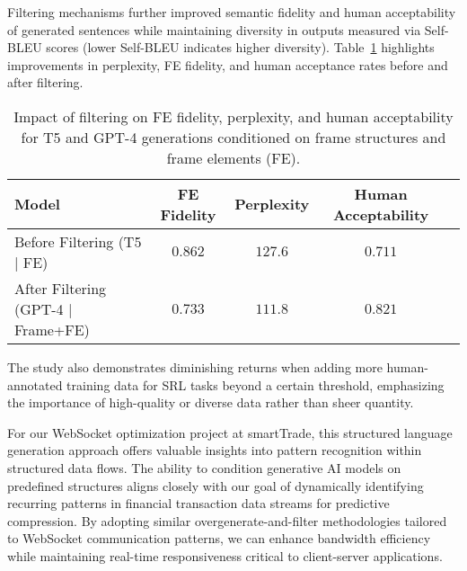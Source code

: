\documentclass[a4paper, 11pt, twoside, openright]{report}
\begin{document}
Filtering mechanisms further improved semantic fidelity and human acceptability of generated sentences while maintaining diversity in outputs measured via Self-BLEU scores (lower Self-BLEU indicates higher diversity). Table~\ref{tab:framenet_filtering} highlights improvements in perplexity, FE fidelity, and human acceptance rates before and after filtering.

\begin{table}[h!]
    \centering
    \begin{tabular}{lcccc}
        \hline
        Model & FE Fidelity & Perplexity & Human Acceptability \\ 
        \hline
        Before Filtering (T5 | FE) & \(0.862\) & \(127.6\) & \(0.711\) \\ 
        After Filtering (GPT-4 | Frame+FE) & \(0.733\) & \(111.8\) & \(0.821\) \\ 
        \hline
    \end{tabular}
    \caption{Impact of filtering on FE fidelity, perplexity, and human acceptability for T5 and GPT-4 generations conditioned on frame structures and frame elements (FE).}
    \label{tab:framenet_filtering}
\end{table}

The study also demonstrates diminishing returns when adding more human-annotated training data for SRL tasks beyond a certain threshold, emphasizing the importance of high-quality or diverse data rather than sheer quantity.

For our WebSocket optimization project at smartTrade, this structured language generation approach offers valuable insights into pattern recognition within structured data flows. The ability to condition generative AI models on predefined structures aligns closely with our goal of dynamically identifying recurring patterns in financial transaction data streams for predictive compression. By adopting similar overgenerate-and-filter methodologies tailored to WebSocket communication patterns, we can enhance bandwidth efficiency while maintaining real-time responsiveness critical to client-server applications.
\end{document}
